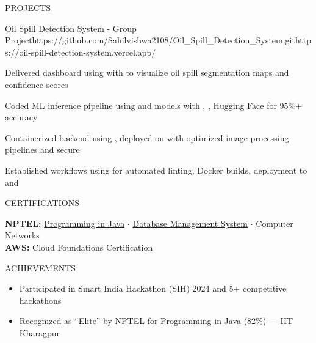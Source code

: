 \documentclass{resume}
\begin{document}
\begin{rSection}{PROJECTS}
\begin{rProject}{Oil Spill Detection System - Group Project}{https://github.com/Sahilvishwa2108/Oil_Spill_Detection_System.git}{https://oil-spill-detection-system.vercel.app/}
\item Delivered dashboard using  with  to visualize oil spill segmentation maps and confidence scores
\item Coded ML inference pipeline using  and  models with , , Hugging Face for 95\%+ accuracy
\item Containerized backend using , deployed on  with optimized image processing pipelines and secure 
\item Established  workflows using  for automated linting, Docker builds, deployment to  and 
\end{rProject}

\end{rSection}

\begin{rSection}{CERTIFICATIONS}

\textbf{NPTEL:} \href{https://archive.nptel.ac.in/content/noc/NOC25/SEM1/Ecertificates/106/noc25-cs57/Course/NPTEL25CS57S124280252304432710.pdf}{Programming in Java} $\cdot$ \href{https://archive.nptel.ac.in/content/noc/NOC25/SEM1/Ecertificates/106/noc25-cs18/Course/NPTEL25CS18S53880028401363129.pdf}{Database Management System} $\cdot$ {Computer Networks} \\[1pt]
\textbf{AWS:} {Cloud Foundations Certification}

\end{rSection}

\begin{rSection}{ACHIEVEMENTS}

\begin{itemize}[leftmargin=12pt, itemsep=0pt, label={\small$\bullet$}]
\item Participated in Smart India Hackathon (SIH) 2024 and 5+ competitive hackathons
\item Recognized as ``Elite'' by NPTEL for Programming in Java (82\%) — IIT Kharagpur
\end{itemize}

\end{rSection}
\end{document}
